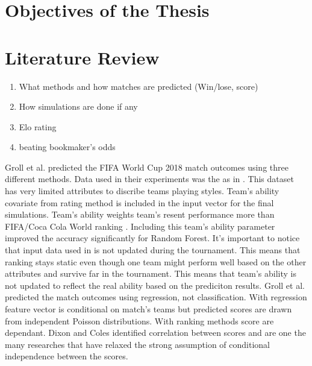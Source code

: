 \section{Objectives of the Thesis}
\section{Literature Review}

\begin{enumerate}
    \item What methods and how matches are predicted (Win/lose, score)
    \item How simulations are done if any
    \item Elo rating
    \item beating bookmaker's odds
\end{enumerate}

Groll et al. \cite{groll2018prediction} predicted the FIFA World Cup 2018 match outcomes using three different methods. Data used in their experiments was the as in \cite{groll2015prediction}. This dataset has very limited attributes to discribe teams playing styles. Team's ability covariate from rating method is included in the input vector for the final simulations. Team's ability weights team's resent performance more than FIFA/Coca Cola World ranking . Including this team's ability parameter improved the accuracy significantly for Random Forest. It's important to notice that input data used in \cite{groll2018prediction} is not updated during the tournament. This means that ranking stays static even though one team might perform well based on the other attributes and survive far in the tournament. This means that team's ability is not updated to reflect the real ability based on the prediciton results.
Groll et al. \cite{groll2018prediction} predicted the match outcomes using regression, not classification. With regression feature vector is conditional on match's teams but predicted scores are drawn from independent Poisson distributions. With ranking methods score are dependant. Dixon and Coles \cite{dixon1997} identified correlation between scores and are one the many researches that have relaxed the strong assumption of conditional independence between the scores.

